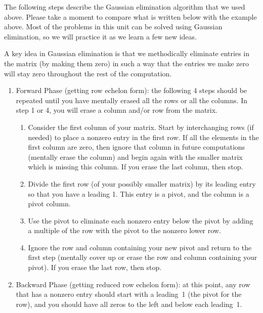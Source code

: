 The following steps describe the Gaussian elimination algorithm that we used above. 
Please take a moment to compare what is written below with the example above. 
Most of the problems in this unit can be solved using Gaussian elimination, so we will practice it as we learn a few new ideas.  

A key idea in Gaussian elimination is that we methodically eliminate entries in the matrix (by making them zero) in such a way that the entries we make zero will stay zero throughout the rest of the computation.
\begin{enumerate}
\item Forward Phase (getting row echelon form): the following 4 steps should be repeated until you have mentally erased all the rows or all the columns. In step 1 or 4, you will erase a column and/or row from the matrix.
\begin{enumerate}
	\item
Consider the first column of your matrix. Start by interchanging rows (if needed) to place a nonzero entry in the first row. If all the elements in the first column are zero, then ignore that column in future computations (mentally erase the column) and begin again with the smaller matrix which is missing this column. If you erase the last column, then stop.
  \item 
  Divide the first row (of your possibly smaller matrix) by its leading entry so that you have a leading 1. This entry is a pivot, and the column is a pivot column. 
	\item Use the pivot to eliminate each nonzero entry below the pivot by adding a multiple of the row with the pivot to the nonzero lower row.
	\item 
	Ignore the row and column containing your new pivot and return to the first step (mentally cover up or erase the row and column containing your pivot). If you erase the last row, then stop.
\end{enumerate}
	\item Backward Phase (getting reduced row echelon form): at this point, any row that has a nonzero entry should start with a leading~1 (the pivot for the row), and you should have all zeros to the left and below each leading~1.
\begin{enumerate}

\end{enumerate}
\end{enumerate}
